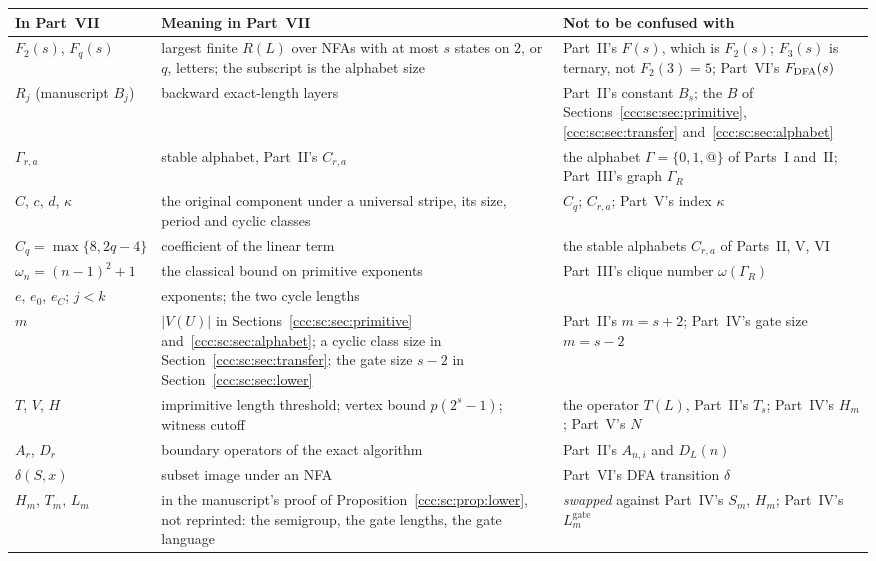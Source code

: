 \documentclass[11pt,letterpaper]{article}
\makeatletter
\theoremstyle{definition}
\theoremstyle{remark}
\newcommand{\guard}{\mathtt{@}}
\newcommand{\Lgate}[1]{L^{\mathrm{gate}}_{#1}}
\makeatother
\begin{document}
\begin{center}\small
\begin{tabular}{@{}>{\raggedright\arraybackslash}p{}>{\raggedright\arraybackslash}p{}>{\raggedright\arraybackslash}p{}@{}}
\toprule
\textbf{In Part~VII} & \textbf{Meaning in Part~VII} & \textbf{Not to be confused with}\\
\midrule
$F_2(s)$, $F_q(s)$ & largest finite $R(L)$ over NFAs with at most $s$ states on $2$, or $q$, letters; the subscript is the alphabet size & Part~II's $F(s)$, which is $F_2(s)$; $F_3(s)$ is ternary, not $F_2(3)=5$; Part~VI's $F_{\rm DFA}(s)$\\[3pt]
$R_j$ (manuscript $B_j$) & backward exact-length layers & Part~II's constant $B_s$; the $B$ of Sections~\ref{ccc:sc:sec:primitive}, \ref{ccc:sc:sec:transfer} and~\ref{ccc:sc:sec:alphabet}\\[3pt]
$\Gamma_{r,a}$ & stable alphabet, Part~II's $C_{r,a}$ & the alphabet $\Gamma=\{0,1,\guard\}$ of Parts~I and~II; Part~III's graph $\Gamma_R$\\[3pt]
$C$, $c$, $d$, $\kappa$ & the original component under a universal stripe, its size, period and cyclic classes & $C_q$; $C_{r,a}$; Part~V's index $\kappa$\\[3pt]
$C_q=\max\{8,2q-4\}$ & coefficient of the linear term & the stable alphabets $C_{r,a}$ of Parts~II, V, VI\\[3pt]
$\omega_n=(n-1)^2+1$ & the classical bound on primitive exponents & Part~III's clique number $\omega(\Gamma_R)$\\[3pt]
$e$, $e_0$, $e_C$; $j<k$ & exponents; the two cycle lengths & \\[3pt]
$m$ & $|V(U)|$ in Sections~\ref{ccc:sc:sec:primitive} and~\ref{ccc:sc:sec:alphabet}; a cyclic class size in Section~\ref{ccc:sc:sec:transfer}; the gate size $s-2$ in Section~\ref{ccc:sc:sec:lower} & Part~II's $m=s+2$; Part~IV's gate size $m=s-2$\\[3pt]
$T$, $V$, $H$ & imprimitive length threshold; vertex bound $p(2^s-1)$; witness cutoff & the operator $T(L)$, Part~II's $T_s$; Part~IV's $H_m$; Part~V's $N$\\[3pt]
$A_r$, $D_r$ & boundary operators of the exact algorithm & Part~II's $A_{n,i}$ and $D_L(n)$\\[3pt]
$\delta(S,x)$ & subset image under an NFA & Part~VI's DFA transition $\delta$\\[3pt]
$H_m$, $T_m$, $L_m$ & in the manuscript's proof of Proposition~\ref{ccc:sc:prop:lower}, not reprinted: the semigroup, the gate lengths, the gate language & \emph{swapped} against Part~IV's $S_m$, $H_m$; Part~IV's $\Lgate m$\\
\bottomrule
\end{tabular}
\end{center}
\end{document}
